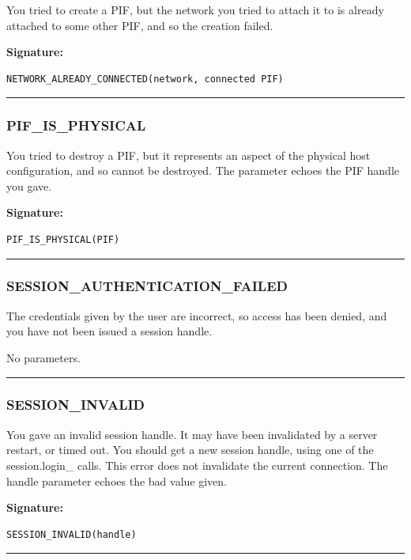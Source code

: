 You tried to create a PIF, but the network you tried to attach it to is
already attached to some other PIF, and so the creation failed.

\vspace{0.3cm}
{\bf Signature:}
\begin{verbatim}NETWORK_ALREADY_CONNECTED(network, connected PIF)\end{verbatim}
\begin{center}\rule{10em}{0.1pt}\end{center}

\subsubsection{PIF\_IS\_PHYSICAL}

You tried to destroy a PIF, but it represents an aspect of the physical
host configuration, and so cannot be destroyed.  The parameter echoes the
PIF handle you gave.

\vspace{0.3cm}
{\bf Signature:}
\begin{verbatim}PIF_IS_PHYSICAL(PIF)\end{verbatim}
\begin{center}\rule{10em}{0.1pt}\end{center}

\subsubsection{SESSION\_AUTHENTICATION\_FAILED}

The credentials given by the user are incorrect, so access has been denied,
and you have not been issued a session handle.

\vspace{0.3cm}
No parameters.
\begin{center}\rule{10em}{0.1pt}\end{center}

\subsubsection{SESSION\_INVALID}

You gave an invalid session handle.  It may have been invalidated by a
server restart, or timed out.  You should get a new session handle, using
one of the session.login\_ calls.  This error does not invalidate the
current connection.  The handle parameter echoes the bad value given.

\vspace{0.3cm}
{\bf Signature:}
\begin{verbatim}SESSION_INVALID(handle)\end{verbatim}
\begin{center}\rule{10em}{0.1pt}\end{center}

